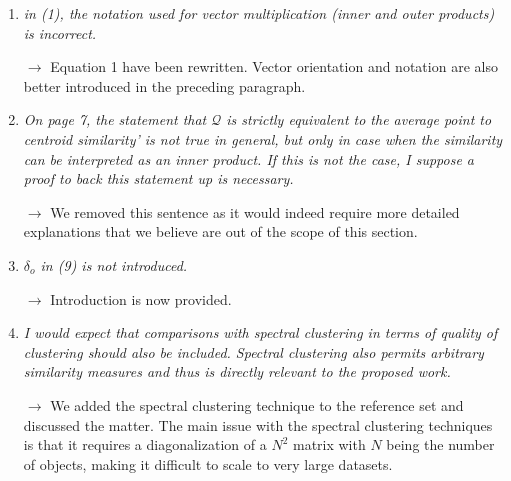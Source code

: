 \documentclass[10pt]{article}
\begin{document}
\begin{enumerate}
\item \emph{in (1), the notation used for vector multiplication (inner and outer products) is incorrect.}

$\rightarrow$ Equation 1 have been rewritten. Vector orientation and notation are also better introduced in the preceding paragraph.

\item \emph{On page 7, the statement that $\mathcal{Q}$ is strictly equivalent to the average point to centroid similarity' is not true in general, but only in case when the similarity can be interpreted as an inner product. If this is not the case, I suppose a proof to back this statement up is necessary.}

$\rightarrow$ We removed this sentence as it would indeed require more detailed explanations that we believe are out of the scope of this section.

\item \emph{$\delta_o$ in (9) is not introduced.}

$\rightarrow$ Introduction is now provided.

\item \emph{I would expect that comparisons with spectral clustering in terms of quality of clustering should also be included. Spectral clustering also permits arbitrary similarity measures and thus is directly relevant to the proposed work.}

$\rightarrow$ We added the spectral clustering technique to the reference set and discussed the matter. The main issue with the spectral clustering techniques is that it requires a diagonalization of a $N^2$ matrix with $N$ being the number of objects, making it difficult to scale to very large datasets.

\end{enumerate}
\end{document}

